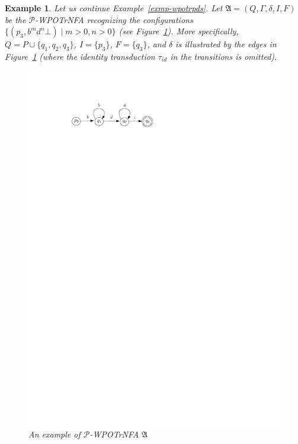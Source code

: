 \documentclass[preprint,12pt]{elsarticle}
\newtheorem{example}{Example}
\newcommand\Pp{{\mathcal{P} }}
\newcommand\Aut{{\mathfrak{A} }}
\newcommand{\WOTrNFA}{\textsf{WPOTrNFA}}
\begin{document}
\begin{example}
Let us continue Example~\ref{exmp-wpotrpds}. Let $\Aut = (Q, \Gamma, \delta, I, F)$ be the $\Pp$-{\WOTrNFA} recognizing the configurations $\{(p_3, b^m d^n \bot) \mid m > 0, n > 0\}$ (see Figure~\ref{fig-pnfa-exmp}). More specifically, $Q= P \cup \{q_1, q_2, q_3\}$, $I = \{p_3\}$, $F= \{q_3\}$, and $\delta$ is illustrated by the edges in Figure~\ref{fig-pnfa-exmp} (where the identity transduction $\tau_{id}$ in the transitions is omitted).  
%
\begin{figure}[htb]
    \centering
	\includegraphics[scale = 0.9]{pnfa-example.pdf}
	\caption{An example of $\Pp$-{\WOTrNFA} $\Aut$}\label{fig-pnfa-exmp}
\end{figure}


\end{example}
\end{document}

